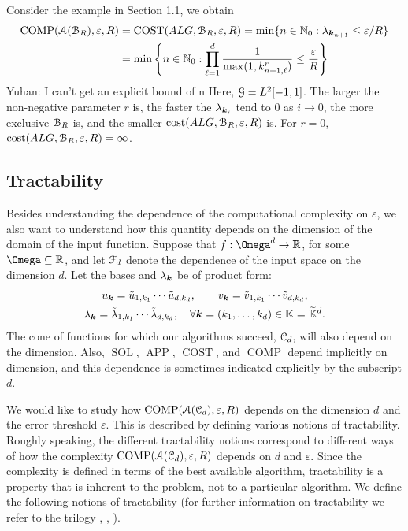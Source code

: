\documentclass[USenglish]{article}
\theoremstyle{dgthm}
\theoremstyle{dgthm}
\theoremstyle{dgthm}
\theoremstyle{dgthm}
\theoremstyle{dgdef}
\theoremstyle{definition}
\DeclareMathOperator{\SOL}{SOL}
\DeclareMathOperator{\APP}{APP}
\DeclareMathOperator{\COST}{COST}
\DeclareMathOperator{\COMP}{COMP}
\newcommand{\tu}{\Tilde{u}}
\newcommand{\tv}{\Tilde{v}}
\newcommand{\tlambda}{\Tilde{\lambda}}
\newcommand{\tbbK}{\widetilde{\bbK}}
\newcommand{\YuhanNote}[1]{{\color{magenta}Yuhan: #1}}
\begin{document}
Consider the example in Section 1.1, we obtain
	\begin{align*}
	\textup{COMP}({\mathcal{A}}({\mathcal{B}}_{R}),\varepsilon,R) &= \textup{COST}(ALG,{\mathcal{B}}_{R},\varepsilon,R) 
	=\min\{ n \in {\mathbb{N}}_0 : \lambda_{{\boldsymbol{k}}_{n+1}} \leq \varepsilon/R \} \\
	& = \min \left\{ n \in {\mathbb{N}}_0: \prod_{\ell =1}^d \frac{1}{\max(1,k^r_{n+1,\ell})} \leq \frac{\varepsilon}{R} \right\} 
	\end{align*}
	\YuhanNote{I can't get an explicit bound of n}
	Here, ${\mathcal{G}}=L^2[-1,1]$.  The larger the non-negative parameter $r$ is, the faster the $\lambda_{{\boldsymbol{k}}_i}$ tend to 0 as $ i \to 0$, the more exclusive ${\mathcal{B}}_R$ is, and the smaller  $\textup{cost}(ALG,{\mathcal{B}}_{R},\varepsilon,R)$ is.  For $r = 0$, $\textup{cost}(ALG,{\mathcal{B}}_{R},\varepsilon,R) = \infty$.

\subsection{Tractability}\label{DHKM:secTractability}



Besides understanding the dependence of the computational complexity on $\varepsilon$, we also want to understand how this quantity depends on the dimension of the domain of the input function.  Suppose that $f: \Omega^d \to \R$, for some $\Omega \subseteq \R$, and let ${\mathcal{F}}_d$ denote the dependence of the input space on the dimension $d$.  Let the bases and $\lambda_{{\boldsymbol{k}}}$ be of product form:
\begin{gather*}
    u_{\bsk} = \tu_{1,k_1} \cdots \tu_{d,k_d}, \qquad  v_{\bsk} = \tv_{1,k_1} \cdots \tv_{d,k_d}, \\ 
    \lambda_{\bsk} = \tlambda_{1,k_1} \cdots \tlambda_{d,k_d}, \quad \forall \bsk = (k_1, \ldots, k_d) \in \bbK = \tbbK^d.
\end{gather*}
The cone of functions for which our algorithms succeed, ${\mathcal{C}}_d$, will also depend on the dimension.  Also, $\SOL$, $\APP$, $\COST$, and $\COMP$ depend implicitly on dimension, and this dependence is sometimes indicated explicitly by the subscript $d$.

\bigskip

We would like to study how $\COMP(\calA(\calC_d), \varepsilon,R)$ 
depends on the dimension $d$ and the error threshold $\varepsilon$. This is described by defining various notions of tractability. Roughly speaking, the different tractability notions correspond to different 
ways of how the complexity $\COMP(\calA(\calC_d), \varepsilon,R)$ depends on $d$ and $\varepsilon$. Since 
the complexity is defined in terms of the best available algorithm, tractability is a property that is inherent to the problem, not to a particular algorithm. 
We define the following notions of tractability (for further information on tractability we refer to the trilogy 
\cite{NovWoz08a}, \cite{NovWoz10a}, \cite{NovWoz12a}). 
\end{document}
